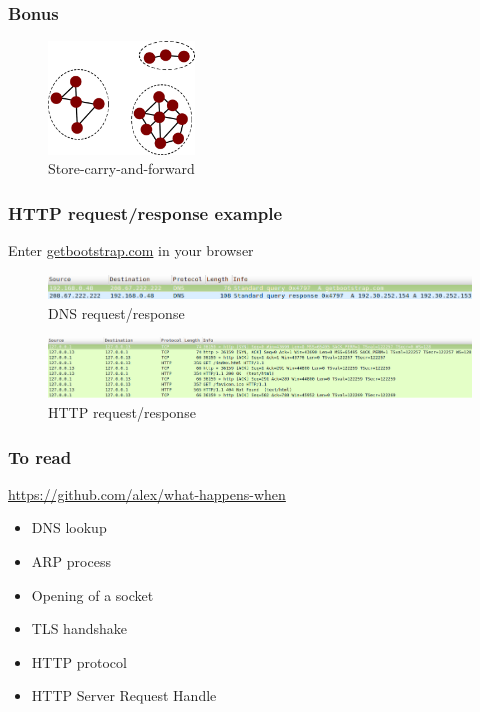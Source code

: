   \begin{frame}
    \frametitle{Bonus}
    \begin{figure}[p]
      \centering
      \includegraphics[height=3cm]{./imgs/store-carry-fwd-3.pdf}
      \caption{Store-carry-and-forward}
    \end{figure}
  \end{frame}


\begin{frame}
    \frametitle{HTTP request/response example}
      Enter \color{blue}\href{http://getbootstrap.com}{getbootstrap.com} \color{black} in your browser\pause
      \begin{figure}
    \includegraphics[width=11.5cm]{./imgs/dns-req.png}
  \caption{DNS request/response}
      \end{figure}
      \pause
      \begin{figure}
    \includegraphics[trim = 0 0 100mm 0, clip, width=11.5cm]{./imgs/http-req.png}
  \caption{HTTP request/response}
      \end{figure}
  \end{frame}
  \begin{frame}
    \frametitle{To read}
      {\color{blue} \href{https://github.com/alex/what-happens-when}{https://github.com/alex/what-happens-when}}
      \begin{itemize}
          \item DNS lookup
          \item ARP process
          \item Opening of a socket
          \item TLS handshake
          \item HTTP protocol
          \item HTTP Server Request Handle
      \end{itemize}
  \end{frame}
